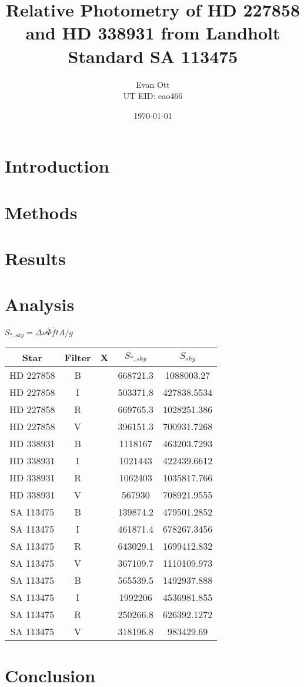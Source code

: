 \documentclass{article}
\title{Relative Photometry of HD 227858 and HD 338931 from Landholt Standard SA 113475}
\author{Evan Ott \\ UT EID: eao466}
\date{\today}
\newcommand{\obar}[1]{\ensuremath{\overline{ #1 }}}
\begin{document}
\maketitle
\section{Introduction}





\section{Methods}








\section{Results}




\section{Analysis}
$S_{*,sky}=\Delta\nu{\obar{\Phi}}{\obar{f}}tA/g$
\begin{tabular}{c | c | c | c | c}
Star & Filter & X & $S_{*,sky}$ & $S_{sky}$ \\
\hline
HD 227858 & B & & 668721.3 & 1088003.27\\
HD 227858 & I & & 503371.8 & 427838.5534\\
HD 227858 & R & & 669765.3 & 1028251.386\\
HD 227858 & V & & 396151.3 & 700931.7268\\
HD 338931 & B & & 1118167 & 463203.7293\\
HD 338931 & I & & 1021443 & 422439.6612\\
HD 338931 & R & & 1062403 & 1035817.766\\
HD 338931 & V & & 567930 & 708921.9555\\
SA 113475 & B & & 139874.2 & 479501.2852\\
SA 113475 & I & & 461871.4 & 678267.3456\\
SA 113475 & R & & 643029.1 & 1699412.832\\
SA 113475 & V & & 367109.7 & 1110109.973\\
SA 113475 & B & & 565539.5 & 1492937.888\\
SA 113475 & I & & 1992206 & 4536981.855\\
SA 113475 & R & & 250266.8 & 626392.1272\\
SA 113475 & V & & 318196.8 & 983429.69\\
\end{tabular}



\section{Conclusion}






\begin{thebibliography}{9}

\end{thebibliography}
\end{document}
